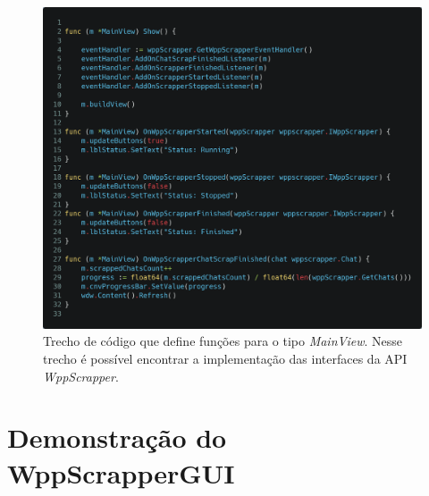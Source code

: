 \begin{figure}[h!]
    \includegraphics[width=\textwidth]{img/code_listeners.png}
    \caption{Trecho de código que define funções para o tipo \textit{MainView}. Nesse trecho é possível encontrar a implementação das interfaces da API \textit{WppScrapper}.}
    \centering
    \label{fig:code_listeners}
\end{figure}







\section{Demonstração do WppScrapperGUI}

